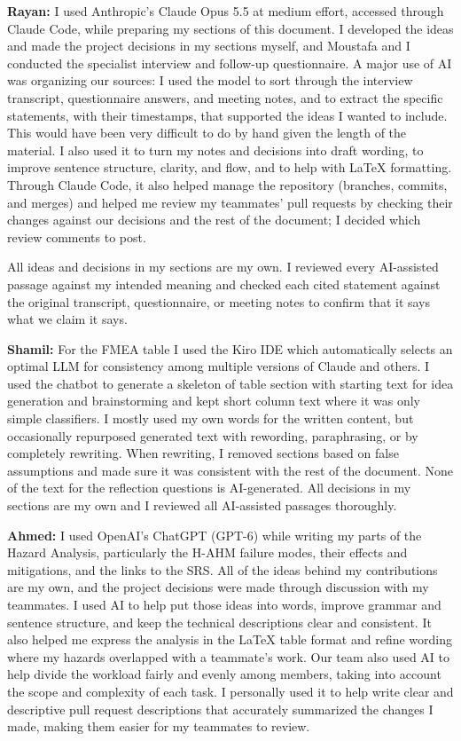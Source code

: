 \documentclass{article}
\begin{document}
\textbf{Rayan:} I used Anthropic's Claude Opus 5.5 at medium effort, accessed
through Claude Code, while preparing my sections of this document. I developed
the ideas and made the project decisions in my sections myself, and Moustafa and
I conducted the specialist interview and follow-up questionnaire. A major use of
AI was organizing our sources: I used the model to sort through the interview
transcript, questionnaire answers, and meeting notes, and to extract the
specific statements, with their timestamps, that supported the ideas I wanted to
include. This would have been very difficult to do by hand given the length of
the material. I also used it to turn my notes and decisions into draft wording,
to improve sentence structure, clarity, and flow, and to help with \LaTeX{}
formatting. Through Claude Code, it also helped manage the repository (branches,
commits, and merges) and helped me review my teammates' pull requests by
checking their changes against our decisions and the rest of the document; I
decided which review comments to post.

All ideas and decisions in my sections are my own. I reviewed every AI-assisted
passage against my intended meaning and checked each cited statement against the
original transcript, questionnaire, or meeting notes to confirm that it says
what we claim it says.

\textbf{Shamil:} For the FMEA table I used the Kiro IDE which automatically
selects an optimal LLM for consistency among multiple versions of Claude and
others. I used the chatbot to generate a skeleton of table section with starting
text for idea generation and brainstorming and kept short column text where it
was only simple classifiers. I mostly used my own words for the written content,
but occasionally repurposed generated text with rewording, paraphrasing, or by
completely rewriting. When rewriting, I removed sections based on false
assumptions and made sure it was consistent with the rest of the document. None
of the text for the reflection questions is AI-generated. All decisions in my
sections are my own and I reviewed all AI-assisted passages thoroughly.

\textbf{Ahmed:} I used OpenAI's ChatGPT (GPT-6) while writing my parts of the
Hazard Analysis, particularly the H-AHM failure modes, their effects and
mitigations, and the links to the SRS. All of the ideas behind my contributions
are my own, and the project decisions were made through discussion with my
teammates. I used AI to help put those ideas into words, improve grammar and
sentence structure, and keep the technical descriptions clear and consistent. It
also helped me express the analysis in the LaTeX table format and refine wording
where my hazards overlapped with a teammate's work. Our team also used AI to
help divide the workload fairly and evenly among members, taking into account
the scope and complexity of each task. I personally used it to help write clear
and descriptive pull request descriptions that accurately summarized the changes
I made, making them easier for my teammates to review.
\end{document}
